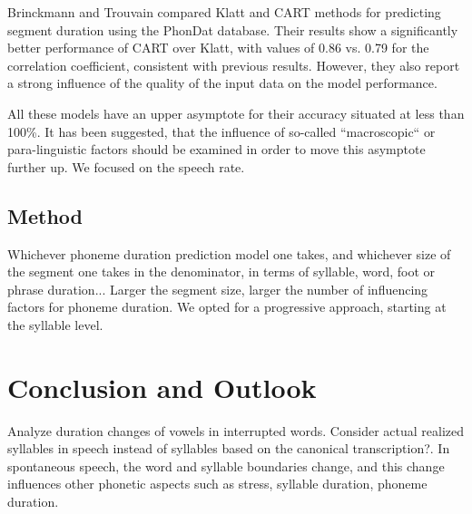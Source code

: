 \documentclass[a4paper]{scrreprt}
\begin{document}
Brinckmann and Trouvain \cite{Brinckmann_2003} compared Klatt and CART methods for predicting segment duration using the PhonDat database. Their results show a significantly better performance of CART over Klatt, with values of 0.86 vs. 0.79 for the correlation coefficient, consistent with previous results. However, they also report a strong influence of  the quality of the input data on the model performance.

All these models have an upper asymptote for their accuracy situated at less than 100\%. It has been suggested, that the influence of so-called ``macroscopic`` \cite{Cummins1999} or para-linguistic \cite{Santen1994} factors should be examined in order to move this asymptote further up. We focused on the speech rate. 

\section{Method}
Whichever phoneme duration prediction model one takes, and whichever size of the segment one takes in the denominator, in terms of syllable, word, foot or phrase duration... Larger the segment size, larger the number of influencing factors for phoneme duration. We opted for a progressive approach, starting at the syllable level.

\chapter{Conclusion and Outlook}
Analyze duration changes of vowels in interrupted words.
Consider actual realized syllables in speech instead of syllables based on the canonical transcription?. In spontaneous speech, the word and syllable boundaries change, and this change influences other phonetic aspects such as stress, syllable duration, phoneme duration.

\printbibliography
\end{document}
